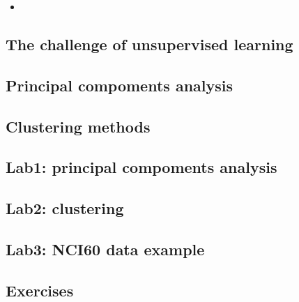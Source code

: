 \begin{itemize}
	\item
 \end{itemize}
\subsection{The challenge of unsupervised learning}

\subsection{Principal compoments analysis}

\subsection{Clustering methods}

\subsection{Lab1: principal compoments analysis}

\subsection{Lab2: clustering}

\subsection{Lab3: NCI60 data example}

\subsection{Exercises}

